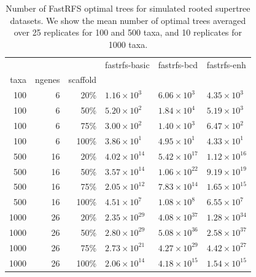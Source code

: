 \begin{table}
\centering
\begin{tabular}{|rrr|lll|}
 
\hline
 & & & fastrfs-basic & fastrfs-bcd & fastrfs-enh\\
taxa&ngenes&scaffold&&&\\


\hline 
\hline
100&6&20\%	&$1.16\times 10^{3}$	&$6.06\times 10^{3}$	&$4.35\times 10^{3}$\\
100&6&50\%	&$5.20\times 10^{2}$	&$1.84\times 10^{4}$	&$5.19\times 10^{3}$\\
100&6&75\%	&$3.00\times 10^{2}$	&$1.40\times 10^{3}$	&$6.47\times 10^{2}$\\
100&6&100\%	&$3.86\times 10^{1}$	&$4.95\times 10^{1}$	&$4.33\times 10^{1}$\\
\hline
500&16&20\%	&$4.02\times 10^{14}$	&$5.42\times 10^{17}$	&$1.12\times 10^{16}$\\
500&16&50\%	&$3.57\times 10^{14}$	&$1.06\times 10^{22}$	&$9.19\times 10^{19}$\\
500&16&75\%	&$2.05\times 10^{12}$	&$7.83\times 10^{14}$	&$1.65\times 10^{15}$\\
500&16&100\%	&$4.51\times 10^{7}$	&$1.08\times 10^{8}$	&$6.55\times 10^{7}$\\
\hline
1000&26&20\%	&$2.35\times 10^{29}$	&$4.08\times 10^{37}$	&$1.28\times 10^{34}$\\
1000&26&50\%	&$2.80\times 10^{29}$	&$5.08\times 10^{36}$	&$2.58\times 10^{37}$\\
1000&26&75\%	&$2.73\times 10^{21}$	&$4.27\times 10^{29}$	&$4.42\times 10^{27}$\\
1000&26&100\%	&$2.06\times 10^{14}$	&$4.18\times 10^{15}$	&$1.54\times 10^{15}$\\
\hline
\end{tabular}


\caption[Number of FastRFS optimal trees for simulated
  rooted supertree datasets.]{Number of FastRFS optimal trees for simulated
  rooted supertree datasets. We show the mean number
  of optimal trees averaged over 25 replicates for 100 and 500 taxa,
  and 10 replicates for 1000 taxa.} \label{supertree_rooted_counts}
\end{table}



